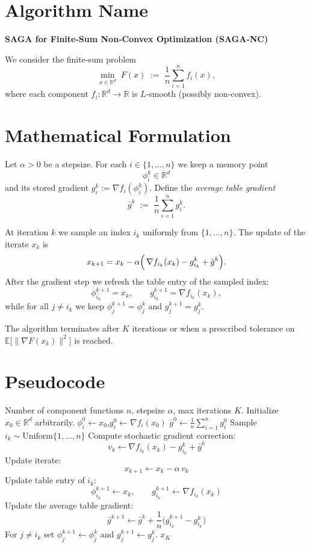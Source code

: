 \documentclass{article}
\newcommand{\E}{\mathbb{E}}
\newcommand{\R}{\mathbb{R}}
\begin{document}
\section*{Algorithm Name}
\textbf{SAGA for Finite‑Sum Non‑Convex Optimization (SAGA‑NC)}  

We consider the finite‑sum problem  
\[
\min_{x\in\R^{d}} \; F(x)\;:=\;\frac{1}{n}\sum_{i=1}^{n} f_i(x),
\]
where each component $f_i:\R^{d}\to\R$ is $L$‑smooth (possibly non‑convex).

\section*{Mathematical Formulation}
Let $\alpha>0$ be a stepsize. For each $i\in\{1,\dots,n\}$ we keep a memory point 
\[
\phi_i^{k}\in\R^{d}
\]
and its stored gradient $g_i^{k}:=\nabla f_i(\phi_i^{k})$.  
Define the \emph{average table gradient}
\[
\bar g^{k}\;:=\;\frac{1}{n}\sum_{i=1}^{n} g_i^{k}.
\]

At iteration $k$ we sample an index $i_k$ uniformly from $\{1,\dots,n\}$.  
The update of the iterate $x_k$ is
\begin{equation}
\label{eq:update}
x_{k+1}=x_{k}-\alpha\Bigl(\,\nabla f_{i_k}(x_{k})-g_{i_k}^{k}+\bar g^{k}\Bigr).
\end{equation}
After the gradient step we refresh the table entry of the sampled index:
\begin{equation}
\label{eq:table}
\phi_{i_k}^{k+1}=x_{k},\qquad 
g_{i_k}^{k+1}= \nabla f_{i_k}(x_{k}),
\end{equation}
while for all $j\neq i_k$ we keep $\phi_{j}^{k+1}=\phi_{j}^{k}$ and $g_{j}^{k+1}=g_{j}^{k}$.  

The algorithm terminates after $K$ iterations or when a prescribed tolerance on
$\E\!\bigl[\|\nabla F(x_k)\|^2\bigr]$ is reached.

\section*{Pseudocode}
\begin{algorithm}[H]
\caption{SAGA‑NC}
\begin{algorithmic}[1]
\Require Number of component functions $n$, stepsize $\alpha$, max iterations $K$.
\State Initialize $x_{0}\in\R^{d}$ arbitrarily.
    \State $\phi_i^{0}\gets x_{0}$,\quad $g_i^{0}\gets \nabla f_i(x_{0})$
\EndFor
\State $\bar g^{0}\gets \frac{1}{n}\sum_{i=1}^{n} g_i^{0}$
    \State Sample $i_k\sim\text{Uniform}\{1,\dots,n\}$
    \State Compute stochastic gradient correction:
    \[
    v_k \gets \nabla f_{i_k}(x_{k}) - g_{i_k}^{k} + \bar g^{k}
    \]
    \State Update iterate:
    \[
    x_{k+1} \gets x_{k} - \alpha\, v_k
    \]
    \State Update table entry of $i_k$:
    \[
    \phi_{i_k}^{k+1}\gets x_{k},\qquad 
    g_{i_k}^{k+1}\gets \nabla f_{i_k}(x_{k})
    \]
    \State Update the average table gradient:
    \[
    \bar g^{k+1}\gets \bar g^{k} + \frac{1}{n}\bigl(g_{i_k}^{k+1}-g_{i_k}^{k}\bigr)
    \]
    \State For $j\neq i_k$ set $\phi_{j}^{k+1}\gets\phi_{j}^{k}$ and $g_{j}^{k+1}\gets g_{j}^{k}$.
\EndFor
\State \Return $x_{K}$
\end{algorithmic}
\end{algorithm}
\end{document}

